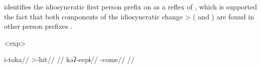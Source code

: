 \textcite[113]{meira1998proto} identifies the idiosyncratic \akuriyo first person prefix  on  as a reflex of , which is supported the fact that both components of the idiosyncratic change  >  ( and ) are found in other person prefixes .

\pex<exp>\akuriyo
\begin{multicols}{2}
\begingl
\gla i-toka//
\glb {}>-hit//
\glft {} \parencite[][86]{gildea1994akuriyo}//
\endgl
{}
\begingl
\gla kəʔ-eepɨ//
\glb {}-come//
\glft {} \parencite[][114]{meira1998proto}//
\endgl
\end{multicols}
\xe
%
%
%
%


